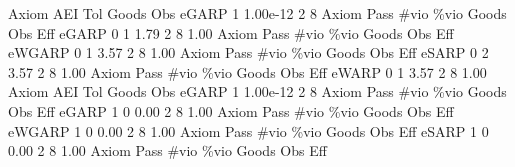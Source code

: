 {\smallskip}
       Axiom {\VBAR}       AEI        Tol      Goods        Obs 
       eGARP {\VBAR}         1   1.00e-12          2          8 
{\smallskip}
{\smallskip}
{\smallskip}
       Axiom {\VBAR} Pass        \#vio        \%vio       Goods         Obs         Eff  
       eGARP {\VBAR}    0           1        1.79           2           8        1.00  
{\smallskip}
{\smallskip}
{\smallskip}
       Axiom {\VBAR} Pass        \#vio        \%vio       Goods         Obs         Eff  
      eWGARP {\VBAR}    0           1        3.57           2           8        1.00  
{\smallskip}
{\smallskip}
{\smallskip}
       Axiom {\VBAR} Pass        \#vio        \%vio       Goods         Obs         Eff  
       eSARP {\VBAR}    0           2        3.57           2           8        1.00  
{\smallskip}
{\smallskip}
{\smallskip}
       Axiom {\VBAR} Pass        \#vio        \%vio       Goods         Obs         Eff  
       eWARP {\VBAR}    0           1        3.57           2           8        1.00  
{\smallskip}
       Axiom {\VBAR}       AEI        Tol      Goods        Obs 
       eGARP {\VBAR}         1   1.00e-12          2          8 
{\smallskip}
{\smallskip}
{\smallskip}
       Axiom {\VBAR} Pass        \#vio        \%vio       Goods         Obs         Eff  
       eGARP {\VBAR}    1           0        0.00           2           8        1.00  
{\smallskip}
{\smallskip}
{\smallskip}
       Axiom {\VBAR} Pass        \#vio        \%vio       Goods         Obs         Eff  
      eWGARP {\VBAR}    1           0        0.00           2           8        1.00  
{\smallskip}
{\smallskip}
{\smallskip}
       Axiom {\VBAR} Pass        \#vio        \%vio       Goods         Obs         Eff  
       eSARP {\VBAR}    1           0        0.00           2           8        1.00  
{\smallskip}
{\smallskip}
{\smallskip}
       Axiom {\VBAR} Pass        \#vio        \%vio       Goods         Obs         Eff  
